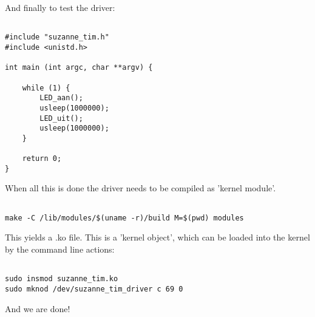 \documentclass[
10pt, %
a4paper, %
oneside, %
headinclude,footinclude, %
BCOR5mm, %
]{scrartcl}
\begin{document}
And finally to test the driver:

\begin{lstlisting}

#include "suzanne_tim.h"
#include <unistd.h>

int main (int argc, char **argv) {

    while (1) {
        LED_aan();
        usleep(1000000);
        LED_uit();
        usleep(1000000);
    }

    return 0;
}

\end{lstlisting}

When all this is done the driver needs to be compiled as 'kernel module'.

\begin{lstlisting}

make -C /lib/modules/$(uname -r)/build M=$(pwd) modules

\end{lstlisting}

This yields a .ko file. This is a 'kernel object', which can be loaded into the kernel by the command line actions:

\begin{lstlisting}

sudo insmod suzanne_tim.ko
sudo mknod /dev/suzanne_tim_driver c 69 0

\end{lstlisting}

And we are done!
\end{document}
